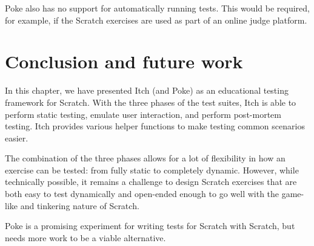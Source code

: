 \documentclass[../main]{subfiles}
\begin{document}
Poke also has no support for automatically running tests.
This would be required, for example, if the Scratch exercises are used as part of an online judge platform.

\section{Conclusion and future work}\label{sec:conclusion-and-future-work}

In this chapter, we have presented Itch (and Poke) as an educational testing framework for Scratch.
With the three phases of the test suites, Itch is able to perform static testing, emulate user interaction, and perform post-mortem testing.
Itch provides various helper functions to make testing common scenarios easier.

The combination of the three phases allows for a lot of flexibility in how an exercise can be tested: from fully static to completely dynamic.
However, while technically possible, it remains a challenge to design Scratch exercises that are both easy to test dynamically and open-ended enough to go well with the game-like and tinkering nature of Scratch.

Poke is a promising experiment for writing tests for Scratch with Scratch, but needs more work to be a viable alternative.
\end{document}
